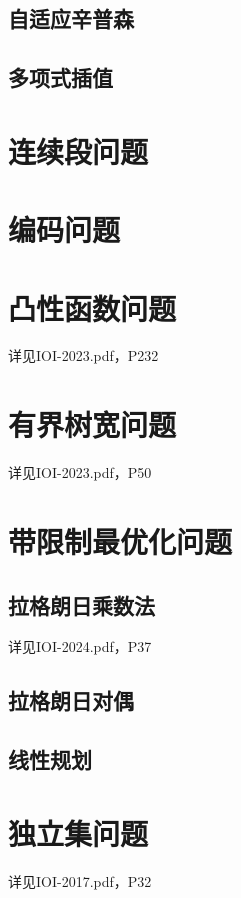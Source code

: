 \documentclass[12pt,a4paper]{article}
\begin{document}
\subsection{自适应辛普森}
\subsection{多项式插值} %

\newpage
\section{连续段问题}

\newpage
\section{编码问题} %

\newpage
\section{凸性函数问题}
详见IOI-2023.pdf，P232

\newpage
\section{有界树宽问题}
详见IOI-2023.pdf，P50

\newpage
\section{带限制最优化问题}
\subsection{拉格朗日乘数法}
详见IOI-2024.pdf，P37
\subsection{拉格朗日对偶}
\subsection{线性规划}

\newpage
\section{独立集问题}
详见IOI-2017.pdf，P32
\end{document}
